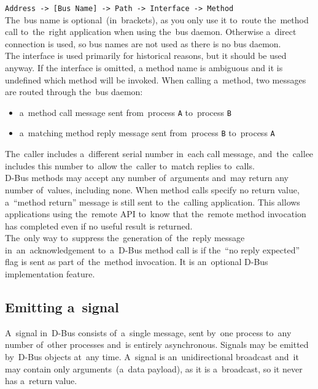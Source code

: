 			\texttt{Address -> [Bus Name] -> Path -> Interface -> Method}\\

The~bus name is optional~(in~brackets), as you only use it to~route the~method
call to~the~right application when using the~bus daemon. Otherwise a~direct
connection is used, so bus names are not used as there is no bus daemon.\\

The interface is used primarily for historical reasons, but it should be used
anyway. If the interface is omitted, a method name is ambiguous and it is
undefined which method will be invoked. When calling a~method, two messages are
routed through the~bus daemon:
\begin{itemize}
	\item a~method call message sent from~process \texttt{A} to~process \texttt{B}
	\item a~matching method reply message sent from~process \texttt{B} to~process \texttt{A}
\end{itemize}
The~caller includes a~different serial number in~each call message, and~the~callee
includes this number to~allow the~caller to~match replies to~calls.\\

D-Bus methods may accept any number of~arguments and~may return any number
of~values, including none. When method calls specify no return value,
a~``method return'' message is still sent to~the~calling application. This
allows applications using the~remote API to~know that the~remote method invocation
has completed even if no useful result is returned.\\

The~only way to~suppress the~generation of~the~reply message in~an~acknowledgement
to~a~D-Bus method call is if the~``no reply expected'' flag is sent as part
of~the~method invocation. It is an~optional D-Bus implementation feature.

\subsection{Emitting a~signal}
A~signal in~D-Bus consists of~a~single message, sent by~one process to~any
number of~other processes and~is entirely asynchronous. Signals may be emitted
by~D-Bus objects at~any time. A~signal is an~unidirectional broadcast and~it may
contain only arguments~(a~data payload), as it is a~broadcast, so it never has
a~return value.\\

